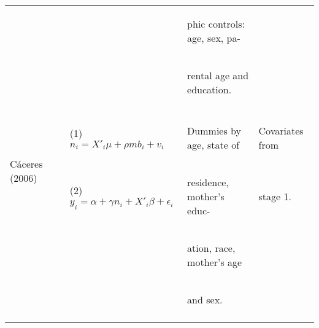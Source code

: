 \documentclass{article}[11pt,subeqn]
\begin{document}
\begin{spacing}{1.25}
\begin{center}
\begin{rotate}{90}
\begin{tabular}{lp{4mm}lll}
\\
& & &
\begin{small}phic controls: age, sex, pa-\end{small}&
\\
& & &
\begin{small}rental age and education.\end{small}&
\\
\begin{footnotesize}\end{footnotesize}&\begin{footnotesize}\end{footnotesize}&\begin{footnotesize}\end{footnotesize}&\begin{footnotesize}\end{footnotesize}&\begin{footnotesize}\end{footnotesize}\\
\multirow{2}{*}{C\'aceres (2006)} & &
(1) $n_i=X'_i\mu + \rho mb_i + v_i$ &
\begin{small}Dummies by age, state of\end{small}&
\begin{small}Covariates from\end{small}
\\
& &
(2) $y_i=\alpha + \gamma n_i + X'_i\beta + \epsilon_i$ &
\begin{small}residence, mother's educ- \end{small}&
\begin{small}stage 1.\end{small}
\\
& & &
\begin{small}ation, race, mother's age\end{small}&
\\
& & &
\begin{small}and sex.\end{small}&
\\
\begin{footnotesize}\end{footnotesize}&\begin{footnotesize}\end{footnotesize}&\begin{footnotesize}\end{footnotesize}&\begin{footnotesize}\end{footnotesize}&\begin{footnotesize}\end{footnotesize}\\

\end{tabular}
\end{rotate}
\end{center}
\end{spacing}
\end{document}
